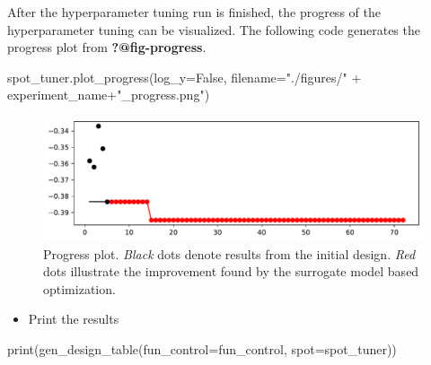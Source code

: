 \documentclass[
  letterpaper,
  DIV=11,
  numbers=noendperiod]{scrreprt}
\newenvironment{Shaded}{\begin{snugshade}}{\end{snugshade}}
\newcommand{\BuiltInTok}[1]{\textcolor[rgb]{0.00,0.23,0.31}{#1}}
\newcommand{\NormalTok}[1]{\textcolor[rgb]{0.00,0.23,0.31}{#1}}
\newcommand{\OperatorTok}[1]{\textcolor[rgb]{0.37,0.37,0.37}{#1}}
\newcommand{\StringTok}[1]{\textcolor[rgb]{0.13,0.47,0.30}{#1}}
\newcommand{\VariableTok}[1]{\textcolor[rgb]{0.07,0.07,0.07}{#1}}
\providecommand{\tightlist}{%
  \setlength{\itemsep}{0pt}\setlength{\parskip}{0pt}}\usepackage{longtable,booktabs,array}
\begin{document}
After the hyperparameter tuning run is finished, the progress of the
hyperparameter tuning can be visualized. The following code generates
the progress plot from \textbf{?@fig-progress}.

\begin{Shaded}
\begin{Highlighting}[]
\NormalTok{spot\_tuner.plot\_progress(log\_y}\OperatorTok{=}\VariableTok{False}\NormalTok{,}
\NormalTok{    filename}\OperatorTok{=}\StringTok{"./figures/"} \OperatorTok{+}\NormalTok{ experiment\_name}\OperatorTok{+}\StringTok{"\_progress.png"}\NormalTok{)}
\end{Highlighting}
\end{Shaded}

\begin{figure}[H]

{\centering \includegraphics{18_spot_hpt_sklearn_multiclass_classification_svc_files/figure-pdf/cell-26-output-1.pdf}

}

\caption{Progress plot. \emph{Black} dots denote results from the
initial design. \emph{Red} dots illustrate the improvement found by the
surrogate model based optimization.}

\end{figure}

\begin{itemize}
\tightlist
\item
  Print the results
\end{itemize}

\begin{Shaded}
\begin{Highlighting}[]
\BuiltInTok{print}\NormalTok{(gen\_design\_table(fun\_control}\OperatorTok{=}\NormalTok{fun\_control,}
\NormalTok{    spot}\OperatorTok{=}\NormalTok{spot\_tuner))}
\end{Highlighting}
\end{Shaded}
\end{document}
